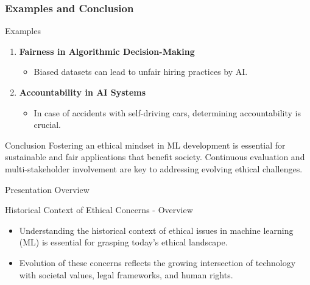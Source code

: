 \documentclass[aspectratio=169]{beamer}
\begin{document}
\begin{frame}[fragile]
    \frametitle{Examples and Conclusion}
    \begin{block}{Examples}
        \begin{enumerate}
            \item \textbf{Fairness in Algorithmic Decision-Making}
                \begin{itemize}
                    \item Biased datasets can lead to unfair hiring practices by AI.
                \end{itemize}

            \item \textbf{Accountability in AI Systems}
                \begin{itemize}
                    \item In case of accidents with self-driving cars, determining accountability is crucial.
                \end{itemize}
        \end{enumerate}
    \end{block}

    \begin{block}{Conclusion}
        Fostering an ethical mindset in ML development is essential for sustainable and fair applications that benefit society. Continuous evaluation and multi-stakeholder involvement are key to addressing evolving ethical challenges.
    \end{block}
\end{frame}

\begin{frame}[fragile]{Presentation Overview}
  \tableofcontents[hideallsubsections]
\end{frame}

\begin{frame}[fragile]{Historical Context of Ethical Concerns - Overview}
    \begin{itemize}
        \item Understanding the historical context of ethical issues in machine learning (ML) is essential for grasping today's ethical landscape.
        \item Evolution of these concerns reflects the growing intersection of technology with societal values, legal frameworks, and human rights.
    \end{itemize}
\end{frame}
\end{document}

